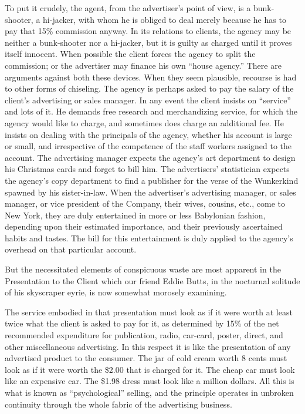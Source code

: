 \documentclass[twoside,nohyper,openany,nobib]{tufte-book}
\begin{document}
To put it crudely, the agent, from the advertiser's point of view, is a
bunk-shooter, a hi-jacker, with whom he is obliged to deal merely
because he has to pay that 15\% commission anyway. In its relations to
clients, the agency may be neither a bunk-shooter nor a hi-jacker, but
it is guilty as charged until it proves itself innocent. When possible
the client forces the agency to split the commission; or the advertiser
may finance his own ``house agency.'' There are arguments against both
these devices. When they seem plausible, recourse is had to other forms
of chiseling. The agency is perhaps asked to pay the salary of the
client's advertising or sales manager. In any event the client insists
on ``service'' and lots of it. He demands free research and
merchandizing service, for which the agency would like to charge, and
sometimes does charge an additional fee. He insists on dealing with the
principals of the agency, whether his account is large or small, and
irrespective of the competence of the staff workers assigned to the
account. The advertising manager expects the agency's art department to
design his Christmas cards and forget to bill him. The advertisers'
statistician expects the agency's copy department to find a publisher
for the verse of the Wunkerkind spawned by his sister-in-law. When the
advertiser's advertising manager, or sales manager, or vice president of
the Company, their wives, cousins, etc., come to New York, they are duly
entertained in more or less Babylonian fashion, depending upon their
estimated importance, and their previously ascertained habits and
tastes. The bill for this entertainment is duly applied to the agency's
overhead on that particular account.

But the necessitated elements of conspicuous waste are most apparent in
the Presentation to the Client which our friend Eddie Butts, in the
nocturnal solitude of his skyscraper eyrie, is now somewhat morosely
examining.

The service embodied in that presentation must look as if it were worth
at least twice what the client is asked to pay for it, as determined by
15\% of the net recommended expenditure for publication, radio,
car-card, poster, direct, and other miscellaneous advertising. In this
respect it is like the presentation of any advertised product to the
consumer. The jar of cold cream worth 8 cents must look as if it were
worth the \$2.00 that is charged for it. The cheap car must look like an
expensive car. The \$1.98 dress must look like a million dollars. All
this is what is known as ``psychological'' selling, and the principle
operates in unbroken continuity through the whole fabric of the
advertising business.
\end{document}
